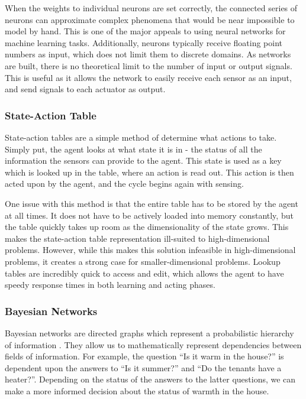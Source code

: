 \documentclass[draftclsnofoot,onecolumn,letterpaper,10pt]{IEEEtran}
\begin{document}
When the weights to individual neurons are set correctly, the connected series of neurons can approximate complex phenomena that would be near impossible to model by hand.
This is one of the major appeals to using neural networks for machine learning tasks.
Additionally, neurons typically receive floating point numbers as input, which does not limit them to discrete domains.
As networks are built, there is no theoretical limit to the number of input or output signals.
This is useful as it allows the network to easily receive each sensor as an input, and send signals to each actuator as output.

\subsubsection{State-Action Table}
State-action tables are a simple method of determine what actions to take.
Simply put, the agent looks at what state it is in - the status of all the information the sensors can provide to the agent.
This state is used as a key which is looked up in the table, where an action is read out.
This action is then acted upon by the agent, and the cycle begins again with sensing.

One issue with this method is that the entire table has to be stored by the agent at all times.
It does not have to be actively loaded into memory constantly, but the table quickly takes up room as the dimensionality of the state grows.
This makes the state-action table representation ill-suited to high-dimensional problems.
However, while this makes this solution infeasible in high-dimensional problems, it creates a strong case for smaller-dimensional problems.
Lookup tables are incredibly quick to access and edit, which allows the agent to have speedy response times in both learning and acting phases.

\subsubsection{Bayesian Networks}
Bayesian networks are directed graphs which represent a probabilistic hierarchy of information \cite{RussellNorvig}.
They allow us to mathematically represent dependencies between fields of information.
For example, the question ``Is it warm in the house?'' is dependent upon the answers to ``Is it summer?'' and ``Do the tenants have a heater?''.
Depending on the status of the answers to the latter questions, we can make a more informed decision about the status of warmth in the house.
\end{document}
